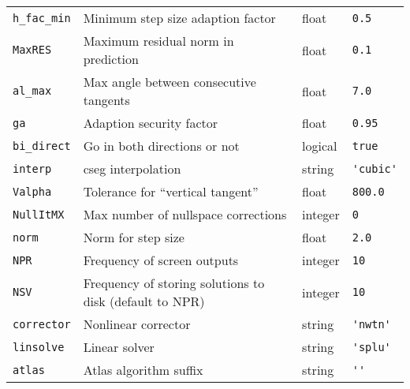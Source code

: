 \documentclass[11pt]{article}
\begin{document}
\begin{table}[h]
\begin{tabular}{l|l|l|l}
    \verb!h_fac_min! & Minimum step size adaption factor                                                                                  & float               & \verb!0.5!             \\[1ex]
    \verb!MaxRES!    & Maximum residual norm in prediction                                                                                & float               & \verb!0.1!             \\[1ex]
    \verb!al_max!    & Max angle between consecutive tangents                                                                             & float               & \verb!7.0!             \\[1ex]
    \verb!ga!        & Adaption security factor                                                                                           & float               & \verb!0.95!            \\[1ex]
    \verb!bi_direct! & Go in both directions or not                                                                                       & logical             & \verb!true!            \\[1ex]
    \verb!interp!    & cseg interpolation                                                                                                 & string              & \verb!'cubic'!         \\[1ex]
    \verb!Valpha!    & Tolerance for ``vertical tangent''                                                                                 & float               & \verb!800.0!           \\[1ex]
    \verb!NullItMX!  & Max number of nullspace corrections                                                                                & integer             & \verb!0!               \\[1ex]
    \verb!norm!      & Norm for step size                                                                                                 & float               & \verb!2.0!             \\[1ex]
    \verb!NPR!       & Frequency of screen outputs                                                                                        & integer             & \verb!10!              \\[1ex]
    \verb!NSV!       & Frequency of storing solutions to disk (default to NPR)                                                            & integer             & \verb!10!              \\[1ex]
    \verb!corrector! & Nonlinear corrector                                                                                                & string              & \verb!'nwtn'!          \\[1ex]
    \verb!linsolve!  & Linear solver                                                                                                      & string              & \verb!'splu'!          \\[1ex]
    \verb!atlas!     & Atlas algorithm suffix                                                                                             & string              & \verb!''!
  \end{tabular}
\end{table}
\end{document}
